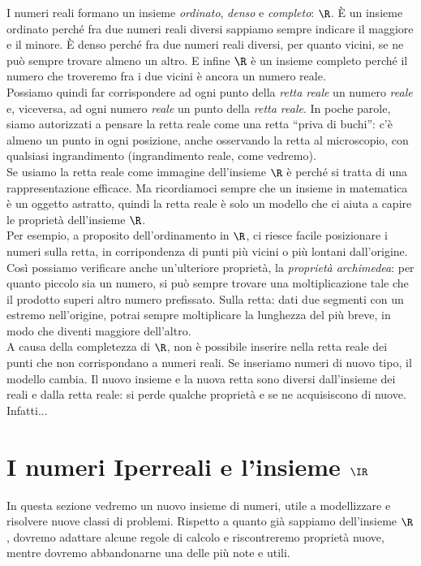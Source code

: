 I numeri reali formano un insieme \emph{ordinato}, \emph{denso} e 
\emph{completo}: $\R$. È un insieme ordinato perché fra due numeri reali
diversi sappiamo sempre indicare il maggiore e il minore. È denso
perché fra due numeri reali diversi, per quanto vicini, se ne può 
sempre trovare almeno un altro. E infine \(\R\) è un insieme completo 
perché il numero che troveremo fra i due vicini è ancora un numero reale.\\
Possiamo quindi far corrispondere ad ogni punto della \emph{retta reale} un 
numero \emph{reale} e, viceversa, ad ogni numero \emph{reale} un punto 
della \emph{retta reale}. In poche parole, siamo
autorizzati a pensare la retta reale come una retta ``priva di buchi'':
c'è almeno un punto
in ogni posizione, anche osservando la retta al microscopio, 
con qualsiasi ingrandimento (ingrandimento reale, come vedremo).\\
Se usiamo la retta reale come immagine dell'insieme \(\R\) è perché
si tratta di una rappresentazione efficace. Ma ricordiamoci sempre che un insieme 
in matematica è un oggetto astratto, quindi la retta reale è solo
un modello che ci aiuta a capire le proprietà dell'insieme \(\R\).\\
Per esempio, a proposito dell'ordinamento in \(\R\), ci riesce facile
posizionare i numeri sulla retta, in corripondenza di punti più vicini o più lontani 
dall'origine. Così possiamo verificare anche un'ulteriore proprietà, la 
\emph{proprietà archimedea}: per quanto piccolo sia un numero, si può 
sempre trovare una moltiplicazione tale che il prodotto superi altro numero
prefissato.
Sulla retta: dati due segmenti con un estremo nell'origine, potrai sempre moltiplicare
la lunghezza del più breve, in modo che diventi maggiore dell'altro.\\
A causa della completezza di \(\R\), non è possibile inserire
nella retta reale dei punti che non corrispondano a numeri reali. Se inseriamo numeri
di nuovo tipo, il modello cambia. Il nuovo insieme e la nuova retta sono
diversi dall'insieme dei reali e dalla retta reale: si perde qualche proprietà 
e se ne acquisiscono di nuove.
Infatti...


\section{I numeri Iperreali e l'insieme $\IR$}
\label{sec:insnum_iperreali}

In questa sezione vedremo un nuovo insieme di numeri, utile a modellizzare e 
risolvere nuove classi di problemi. Rispetto a quanto già sappiamo dell'insieme 
\(\R\), dovremo adattare alcune regole di calcolo e riscontreremo proprietà nuove, mentre 
dovremo abbandonarne una delle più note e utili. 

